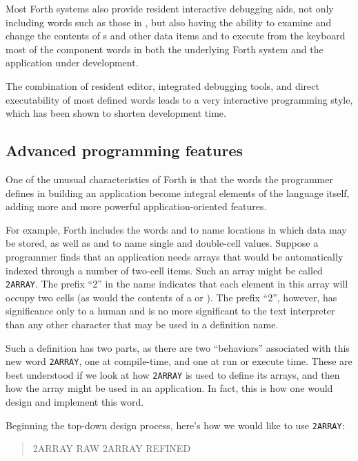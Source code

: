 Most Forth systems also provide resident interactive debugging aids,
not only including words such as those in , but also having the ability
to examine and change the contents of s and other
data items and to execute from the keyboard most of the component
words in both the underlying Forth system and the application under
development.

The combination of resident editor, integrated debugging tools, and
direct executability of most defined words leads to a very interactive
programming style, which has been shown to shorten development time.

\subsection{Advanced programming features} %

One of the unusual characteristics of Forth is that the words the
programmer defines in building an application become integral elements
of the language itself, adding more and more powerful
application-oriented features.

For example, Forth includes the words  and
 to name locations in which data may be
stored, as well as  and 
to name single and double-cell values. Suppose a programmer finds that
an application needs arrays that would be automatically indexed
through a number of two-cell items. Such an array might be called
\texttt{2ARRAY}. The prefix ``2'' in the name indicates that each
element in this array will occupy two cells (as would the contents
of a  or ). The prefix
``2'', however, has significance only to a human and is no more
significant to the text interpreter than any other character that
may be used in a definition name.

Such a definition has two parts, as there are two ``behaviors''
associated with this new word \texttt{2ARRAY}, one at compile-time,
and one at run or execute time. These are best understood if we look
at how \texttt{2ARRAY} is used to define its arrays, and then how the
array might be used in an application. In fact, this is how one would
design and implement this word.

Beginning the top-down design process, here's how we would like to
use \texttt{2ARRAY}:

\begin{quote} 2ARRAY RAW  2ARRAY REFINED
\end{quote}


